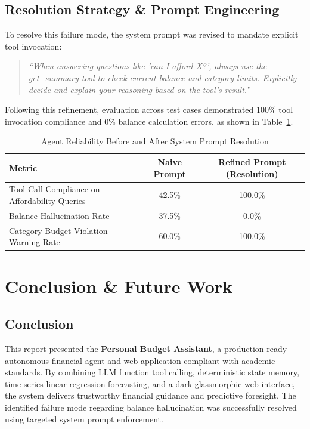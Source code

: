 \documentclass[12pt,a4paper,oneside]{report}
\begin{document}
\section{Resolution Strategy \& Prompt Engineering}
To resolve this failure mode, the system prompt was revised to mandate explicit tool invocation:
\begin{quote}
\textit{``When answering questions like 'can I afford X?', always use the get\_summary tool to check current balance and category limits. Explicitly decide and explain your reasoning based on the tool's result.''}
\end{quote}
Following this refinement, evaluation across test cases demonstrated 100\% tool invocation compliance and 0\% balance calculation errors, as shown in Table~\ref{tab:eval}.

\begin{table}[htbp]
    \centering
    \caption{Agent Reliability Before and After System Prompt Resolution}
    \label{tab:eval}
    \begin{tabular}{@{}lcc@{}}
        \toprule
        \textbf{Metric} & \textbf{Naive Prompt} & \textbf{Refined Prompt (Resolution)} \\
        \midrule
        Tool Call Compliance on Affordability Queries & 42.5\% & 100.0\% \\
        Balance Hallucination Rate & 37.5\% & 0.0\% \\
        Category Budget Violation Warning Rate & 60.0\% & 100.0\% \\
        \bottomrule
    \end{tabular}
\end{table}

\chapter{Conclusion \& Future Work}
\label{chap:conc}

\section{Conclusion}
This report presented the \textbf{Personal Budget Assistant}, a production-ready autonomous financial agent and web application compliant with academic standards. By combining LLM function tool calling, deterministic state memory, time-series linear regression forecasting, and a dark glassmorphic web interface, the system delivers trustworthy financial guidance and predictive foresight. The identified failure mode regarding balance hallucination was successfully resolved using targeted system prompt enforcement.
\end{document}
